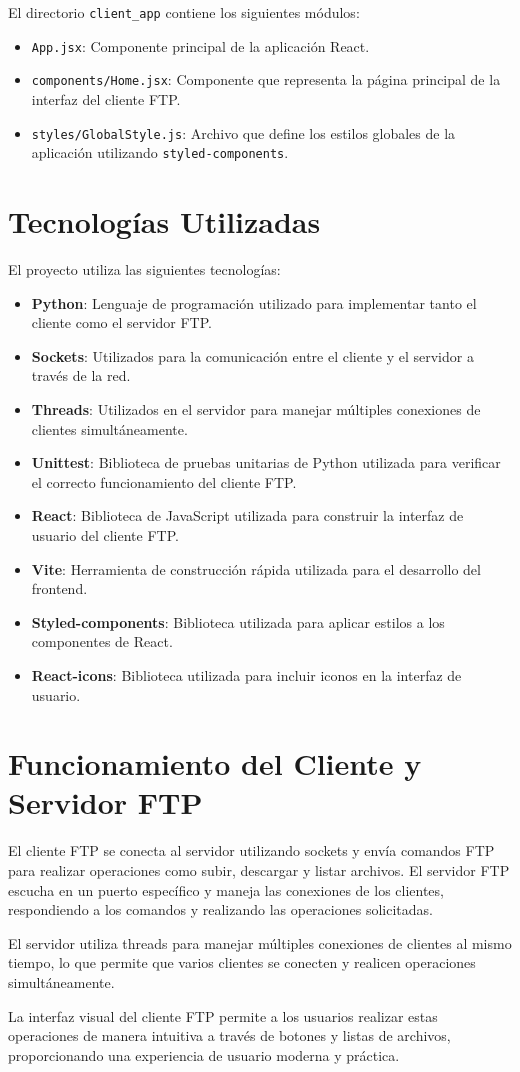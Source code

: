 \documentclass[a4paper, 12pt]{article}
\begin{document}
El directorio \texttt{client\_app} contiene los siguientes módulos:

\begin{itemize}
    \item \texttt{App.jsx}: Componente principal de la aplicación React.
    \item \texttt{components/Home.jsx}: Componente que representa la página principal de la interfaz del cliente FTP.
    \item \texttt{styles/GlobalStyle.js}: Archivo que define los estilos globales de la aplicación utilizando \texttt{styled-components}.
\end{itemize}

\section{Tecnologías Utilizadas}
El proyecto utiliza las siguientes tecnologías:

\begin{itemize}
    \item \textbf{Python}: Lenguaje de programación utilizado para implementar tanto el cliente como el servidor FTP.
    \item \textbf{Sockets}: Utilizados para la comunicación entre el cliente y el servidor a través de la red.
    \item \textbf{Threads}: Utilizados en el servidor para manejar múltiples conexiones de clientes simultáneamente.
    \item \textbf{Unittest}: Biblioteca de pruebas unitarias de Python utilizada para verificar el correcto funcionamiento del cliente FTP.
    \item \textbf{React}: Biblioteca de JavaScript utilizada para construir la interfaz de usuario del cliente FTP.
    \item \textbf{Vite}: Herramienta de construcción rápida utilizada para el desarrollo del frontend.
    \item \textbf{Styled-components}: Biblioteca utilizada para aplicar estilos a los componentes de React.
    \item \textbf{React-icons}: Biblioteca utilizada para incluir iconos en la interfaz de usuario.
\end{itemize}

\section{Funcionamiento del Cliente y Servidor FTP}
El cliente FTP se conecta al servidor utilizando sockets y envía comandos FTP para realizar operaciones como subir, descargar y listar archivos. El servidor FTP escucha en un puerto específico y maneja las conexiones de los clientes, respondiendo a los comandos y realizando las operaciones solicitadas.

El servidor utiliza threads para manejar múltiples conexiones de clientes al mismo tiempo, lo que permite que varios clientes se conecten y realicen operaciones simultáneamente.

La interfaz visual del cliente FTP permite a los usuarios realizar estas operaciones de manera intuitiva a través de botones y listas de archivos, proporcionando una experiencia de usuario moderna y práctica.
\end{document}
